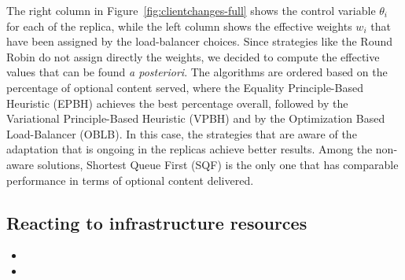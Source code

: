 The right column in Figure~\ref{fig:clientchanges-full} shows the control 
variable $\theta_i$ for each of the replica, while the left column shows
the effective weights $w_i$ that have been assigned by the load-balancer
choices. Since strategies like the Round Robin do not assign directly the
weights, we decided to compute the effective values that can be found
\emph{a posteriori}. The algorithms are ordered based on the percentage
of optional content served, where the Equality Principle-Based Heuristic
(EPBH) achieves the best percentage overall, followed by the Variational 
Principle-Based Heuristic (VPBH) and by the Optimization Based Load-Balancer
(OBLB). In this case, the strategies that are aware of the adaptation that
is ongoing in the replicas achieve better results. Among the non-aware
solutions, Shortest Queue First (SQF) is the only one that has
comparable performance in terms of optional content delivered.


\subsection{Reacting to infrastructure resources}

\begin{itemize}
\item {}
\item {}
\end{itemize}

